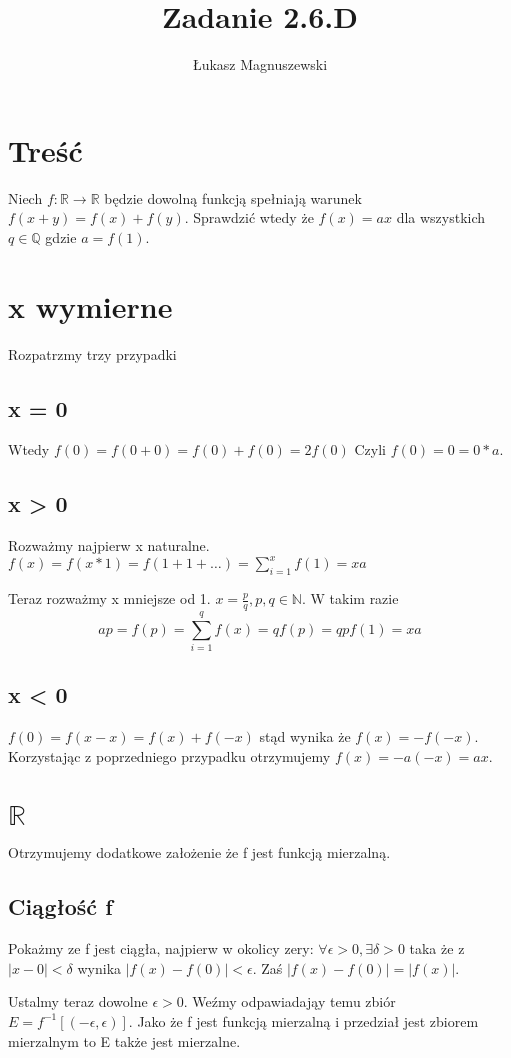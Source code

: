\documentclass{article}
\title{Zadanie 2.6.D}
\author{Łukasz Magnuszewski}
\date{\vspace{-5ex}}
\begin{document}
\maketitle
\section*{Treść}
Niech $f : \mathbb{R} \to \mathbb{R}$ będzie dowolną funkcją spełniają warunek $f(x+y) = f(x) + f(y)$. Sprawdzić wtedy że $f(x) = a x$ dla wszystkich $q \in \mathbb{Q}$ gdzie $a = f(1)$.

\section*{x wymierne}
Rozpatrzmy trzy przypadki
\subsection*{x = 0}
Wtedy $f(0) = f(0 + 0) = f(0) + f(0) = 2 f(0)$ Czyli $f(0) = 0 = 0 * a $.
\subsection*{x > 0} 
Rozważmy najpierw x naturalne. $f(x) = f(x * 1) = f(1 + 1 + \dots) = \sum_{i=1}^x f(1) = x a$

Teraz rozważmy x mniejsze od 1. $x = \frac{p}{q}, p,q \in \mathbb{N}$. W takim razie \[
  a p = f(p) = \sum^q_{i=1} f(x) = q f(p) = q p f(1) = x a
\]
\subsection*{x < 0} 
$f(0) = f(x - x) = f(x) + f(-x)$ stąd wynika że $f(x) = -f(-x)$. Korzystając z poprzedniego przypadku otrzymujemy $f(x) = -a(-x) = a x$. 

\section*{$\mathbb{R}$}
Otrzymujemy dodatkowe założenie że f jest funkcją mierzalną.
\subsection*{Ciągłość f}
Pokażmy ze f jest ciągła, najpierw w okolicy zery: $\forall \epsilon > 0, \exists \delta > 0$ taka że z $|x - 0| <\delta$ wynika $|f(x) - f(0)| < \epsilon$. Zaś $|f(x) -f(0)| =|f(x)|$.

Ustalmy teraz dowolne $ \epsilon > 0$. Weźmy odpawiadająy temu zbiór $E = f^{-1}[(-\epsilon,\epsilon)]$. Jako że f jest funkcją mierzalną i przedział jest zbiorem mierzalnym to E także jest mierzalne.
\end{document}
